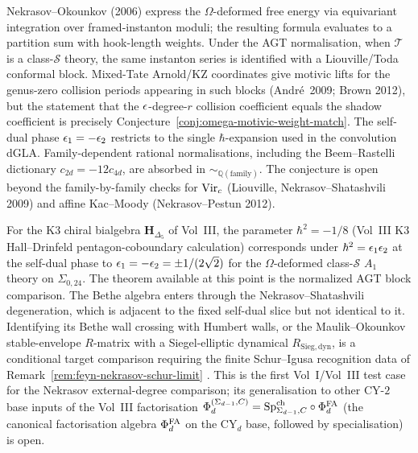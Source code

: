 \begin{remark}
\label{rem:omega-motivic-weight-match-strategy}
Nekrasov--Okounkov (2006) express the $\Omega$-deformed free energy via
equivariant integration over framed-instanton moduli; the resulting
formula evaluates to a partition sum with hook-length weights. Under
the AGT normalisation, when $\mathcal T$ is a class-$\mathcal S$
theory, the same instanton series is identified with a
Liouville/Toda conformal block. Mixed-Tate
Arnold/KZ coordinates give motivic lifts for the genus-zero collision
periods appearing in such blocks (Andr\'e~2009; Brown 2012), but the
statement that the $\epsilon$-degree-$r$ collision coefficient equals the
shadow coefficient is precisely Conjecture~\ref{conj:omega-motivic-weight-match}.
The self-dual phase $\epsilon_1=-\epsilon_2$ restricts to the single
$\hbar$-expansion used in the convolution dGLA. Family-dependent
rational normalisations, including the Beem--Rastelli dictionary
$c_{2d}=-12c_{4d}$, are absorbed in
$\sim_{\mathbb Q(\mathrm{family})}$. The conjecture is open beyond the
family-by-family checks for $\mathrm{Vir}_c$ (Liouville,
Nekrasov--Shatashvili 2009) and affine Kac--Moody
(Nekrasov--Pestun 2012).
\end{remark}

\begin{remark}[K3 instance: $\hbar^2 = -1/8$ vs.\ self-dual
$\ep^2 = 1/8$]
\label{rem:omega-k3-self-dual}
For the K3 chiral bialgebra $\mathbf{H}_{\Delta_5}$ of Vol~III, the
parameter $\hbar^2 = -1/8$ (Vol~III K3 Hall--Drinfeld pentagon-coboundary
calculation)
corresponds under $\hbar^2 = \epsilon_1\epsilon_2$ at the self-dual phase to
$\epsilon_1 = -\epsilon_2 = \pm 1/(2\sqrt{2})$ for the $\Omega$-deformed
class-$\mathcal S$ $A_1$ theory on $\Sigma_{0,24}$. The theorem
available at this point is the normalized AGT block comparison. The
Bethe algebra enters through the Nekrasov--Shatashvili degeneration,
which is adjacent to the fixed self-dual slice but not identical to it.
Identifying its Bethe wall crossing with Humbert walls, or the
Maulik--Okounkov stable-envelope $R$-matrix with a
Siegel-elliptic dynamical $R_{\mathrm{Sieg,dyn}}$, is a conditional
target comparison requiring the finite Schur--Igusa recognition data of
Remark~\ref{rem:feyn-nekrasov-schur-limit}
\cite{NekrasovShatashvili2009,MaulikOkounkov12}. This is the first
Vol~I/Vol~III test case for the Nekrasov external-degree comparison;
its generalisation to other CY-$2$ base inputs of the Vol~III
factorisation
$\Phi_d^{(\Sigma_{d-1},C)} = \mathrm{Sp}^{\mathrm{ch}}_{\Sigma_{d-1}, C} \circ \Phi^{\mathrm{FA}}_d$ (the canonical
factorisation algebra $\Phi^{\mathrm{FA}}_d$ on the CY$_d$ base, followed by
specialisation) is open.
\end{remark}

